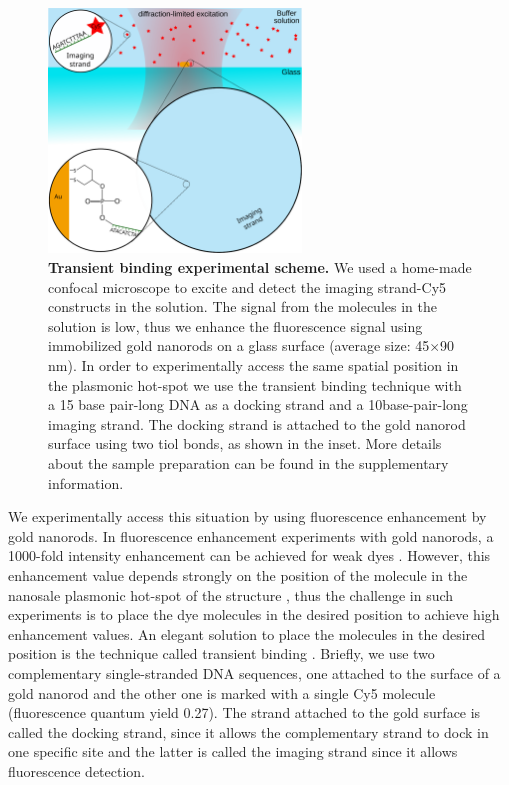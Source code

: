 \begin{figure}
\centering
\includegraphics[width=0.6\textwidth]{Transient_scheme}%
\caption{\textbf{Transient binding experimental scheme.} We used a home-made confocal microscope to excite and detect the imaging strand-Cy5 constructs in the solution. The signal from the molecules in the solution is low, thus we enhance the fluorescence signal using immobilized gold nanorods on a glass surface (average size: 45$\times$90 nm). In order to experimentally access the same spatial position in the plasmonic hot-spot we use the transient binding technique with a 15 base pair-long DNA as a docking strand and a 10base-pair-long imaging strand. The docking strand is attached to the gold nanorod surface using two tiol bonds, as shown in the inset. More details about the sample preparation can be found in the supplementary information. 
\label{fg:transient}}
\end{figure}

We experimentally access this situation by using fluorescence enhancement by gold nanorods. In fluorescence enhancement experiments with gold nanorods, a 1000-fold intensity enhancement can be achieved for weak dyes \cite{yuan2013thousand,khatua2014resonant}. However, this enhancement value depends strongly on the position of the molecule in the nanosale plasmonic hot-spot of the structure \cite{khatua2014resonant}, thus the challenge in such experiments is to place the dye molecules in the desired position to achieve high enhancement values. An elegant solution to place the molecules in the desired position is the technique called transient binding \cite{acuna2012fluorescence}.
Briefly, we use two complementary single-stranded DNA sequences, one attached to the surface of a gold nanorod and the other one is marked with a single Cy5 molecule (fluorescence quantum yield 0.27). The strand attached to the gold surface is  called the docking strand, since it allows the complementary strand to dock in one specific site and the latter is called the imaging strand since it allows fluorescence detection. 

